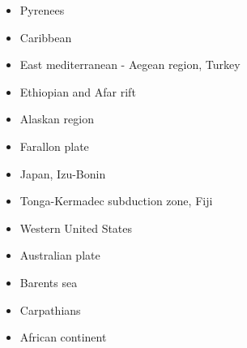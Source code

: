 \begin{itemize}
\item {Pyrenees} 
{\scriptsize
\cite{qubh93}
\cite{giju98}
\cite{bemh00}
\cite{mcmg04}\cite{siss04}
\cite{jaml10}
\cite{vime12}
\cite{fihv13b}
\cite{dual19}
}
\item{Caribbean} 
{\scriptsize
\cite{vago10}
\cite{vags13}
\cite{bovt14}\cite{vagw14}
}
\item{East mediterranean - Aegean region, Turkey} 
{\scriptsize
\cite{cazf10}
\cite{ozgw17}
}
\item{Ethiopian and Afar rift} 
{\scriptsize
\cite{mitk07}
\cite{cort08}
\cite{kekj09}
\cite{beve10}
\cite{phcs14}
\cite{brcr17}
\cite{brcg17}
\cite{cocf19}
}
\item{Alaskan region} 
{\scriptsize
\cite{jabi12}
\cite{jabr13}
\cite{haja17}
\cite{mimo18}
}
\item{Farallon plate} 
{\scriptsize
\cite{lisg08}
\cite{list11}
\cite{list12}
}
\item{Japan, Izu-Bonin}  
{\scriptsize
\cite{lohd07}\cite{kigk14}\cite{leli14}\cite{kilk15}\cite{yagz17}\cite{yamg19}
}
\item{Tonga-Kermadec subduction zone, Fiji} 
{\scriptsize
\cite{bigs03}\cite{bigu03}
\cite{zhpy06}
}
\item{Western United States}
{\scriptsize
\cite{besb06}
}
\item Australian plate 
{\scriptsize
\cite{himu03}\cite{wemv03}
\cite{onmj05}
\cite{hazs10}\cite{dimg10}
\cite{mahg11}\cite{digm11}
\cite{scsp15}
}
\item Barents sea 
{\scriptsize
\cite{buto07b}
\cite{gahs14}
}
\item Carpathians 
{\scriptsize
\cite{clbm04}
\cite{sepg19}
}
\item African continent 
{\scriptsize
\cite{gikb94}
\cite{vabt11}
\cite{busm12}
\cite{wakc17}
}
\end{itemize}
